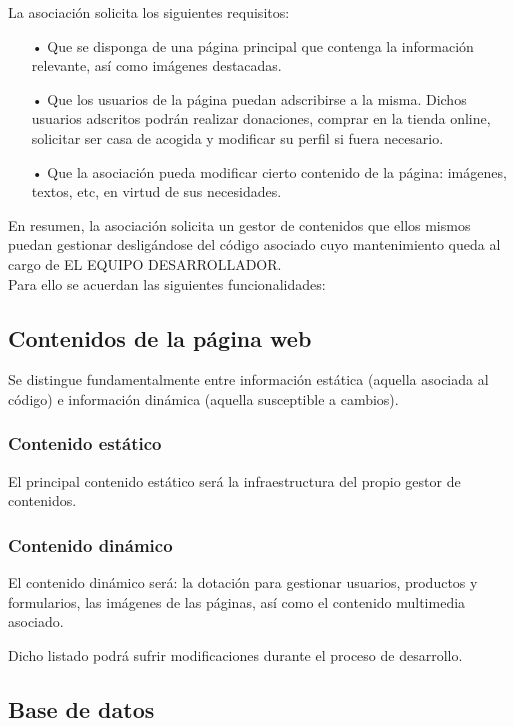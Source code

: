 \documentclass[12pt]{article}
\theoremstyle{definition}
\begin{document}
La asociación solicita los siguientes requisitos:

\begin{itemize}
\item[•] Que se disponga de una página principal que contenga la información relevante, así como imágenes destacadas.
\item[•] Que los usuarios de la página puedan adscribirse a la misma. Dichos usuarios adscritos podrán realizar donaciones, comprar en la tienda online, solicitar ser casa de acogida y modificar su perfil si fuera necesario.
\item[•] Que la asociación pueda modificar cierto contenido de la página: imágenes, textos, etc, en virtud de sus necesidades.
\end{itemize}


En resumen, la asociación solicita un gestor de contenidos que ellos mismos puedan gestionar desligándose del código asociado cuyo mantenimiento queda al cargo de EL EQUIPO DESARROLLADOR.\\

Para ello se acuerdan las siguientes funcionalidades:

\subsection*{Contenidos de la página web}

Se distingue fundamentalmente entre información estática (aquella asociada al código) e información dinámica (aquella susceptible a cambios).\\

\subsubsection*{Contenido estático}

El principal contenido estático será la infraestructura del propio gestor de contenidos. 

\subsubsection*{Contenido dinámico}

El contenido dinámico será: la dotación para gestionar usuarios, productos y formularios, las imágenes de las páginas, así como el contenido multimedia asociado. 

Dicho listado podrá sufrir modificaciones durante el proceso de desarrollo.


\subsection*{Base de datos}
\end{document}

